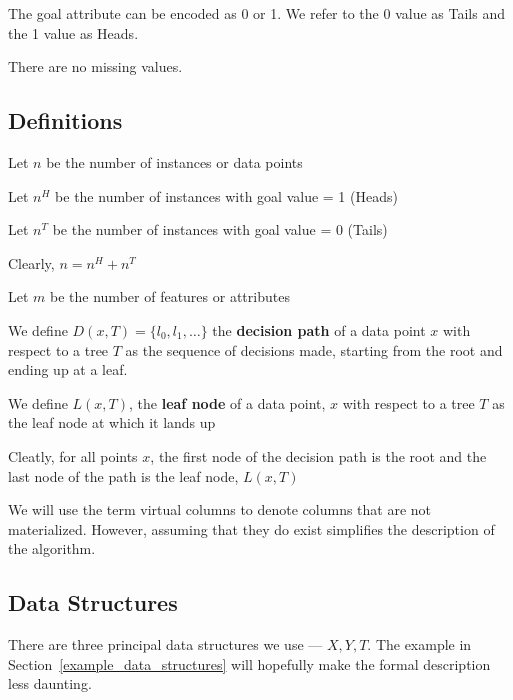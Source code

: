 \documentclass[12pt,letterpaper]{article}
\begin{document}
\be
\item The goal attribute can be encoded as 0 or 1. We
  refer to the 0 value as Tails and the 1 value as Heads.
\item There are no missing values. 
\ee

\subsection{Definitions}
\be
\item Let \(n\) be the number of instances or data points
\item Let \(n^H\) be the number of instances with goal value = 1 (Heads)
\item Let \(n^T\) be the number of instances with goal value = 0 (Tails)
\item Clearly, \(n = n^H+n^T\)
\item Let \(m\) be the number of features or attributes
\ee

\begin{definition}
\label{decision_path}
We define \(D(x, T) = \{l_0, l_1, \ldots\}\) the {\bf decision path} of a data point \(x\) with
  respect to a tree \(T\) as the sequence of decisions made, starting from the root and ending up at a leaf.
  \TBC
\end{definition}


\begin{definition}
\label{leaf_node}
We define \(L(x, T)\), the {\bf leaf node} of a data point, \(x\) with 
respect to a tree \(T\) as the leaf node at which it lands up \TBC 
\end{definition}

Cleatly, for all points \(x\), the first node of the decision path 
is the root and the last node of the path is the leaf node, \(L(x, T)\)


We will use the term virtual columns to denote columns that are not
materialized. However, assuming that they do exist simplifies the description of
the algorithm.


\subsection{Data Structures}
There are three principal data structures we use ---  \(X, Y, T\).
The example in Section~\ref{example_data_structures} will hopefully make the
formal description less daunting.
\end{document}
